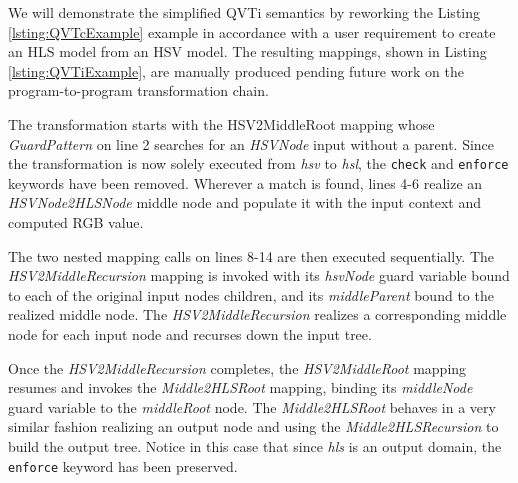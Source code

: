 We will demonstrate the simplified QVTi semantics by reworking the Listing \ref{lsting:QVTcExample} example in accordance with a user requirement to create an HLS model from an HSV model. The resulting mappings, shown in Listing \ref{lsting:QVTiExample}, are manually produced pending future work on the program-to-program transformation chain.




The transformation starts with the HSV2MiddleRoot mapping whose \textit{GuardPattern} on line 2 searches for an \textit{HSVNode} input without a parent. Since the transformation is now solely executed from \textit{hsv} to \textit{hsl}, the \texttt{check} and \texttt{enforce} keywords have been removed. Wherever a match is found, lines 4-6 realize an \textit{HSVNode2HLSNode} middle node and populate it with the input context and computed RGB value.

The two nested mapping calls on lines 8-14 are then executed sequentially. The \textit{HSV2MiddleRecursion} mapping is invoked with its \textit{hsvNode} guard variable bound to each of the original input nodes children, and its \textit{middleParent} bound to the realized middle node. The \textit{HSV2MiddleRecursion} realizes a corresponding middle node for each input node and recurses down the input tree.

Once the \textit{HSV2MiddleRecursion} completes, the \textit{HSV2MiddleRoot} mapping resumes and invokes the \textit{Middle2HLSRoot} mapping, binding its \textit{middleNode} guard variable to the \textit{middleRoot} node. The \textit{Middle2HLSRoot} behaves in a very similar fashion realizing an output node and using the \textit{Middle2HLSRecursion} to build the output tree. Notice in this case that since \textit{hls} is an output domain, the \texttt{enforce} keyword has been preserved.

